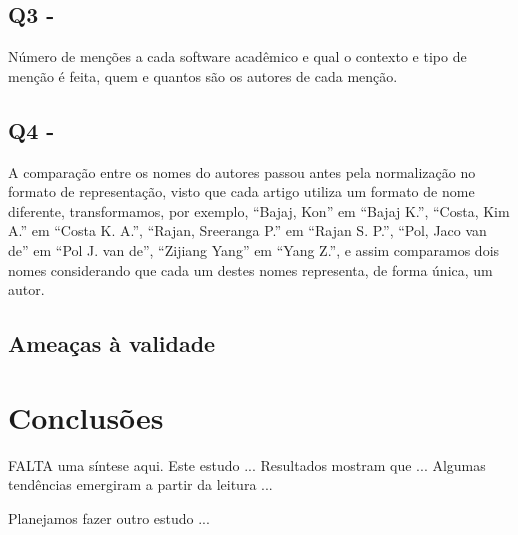 \subsection{Q3 - \EstudoDoisQuestaoTres}

Número de menções a cada software acadêmico e qual o contexto e tipo de menção
é feita, quem e quantos são os autores de cada menção.

\subsection{Q4 - \EstudoDoisQuestaoQuatro}

A comparação entre os nomes do autores passou antes pela normalização
no formato de representação, visto que cada artigo utiliza um formato
de nome diferente, transformamos, por exemplo, ``Bajaj, Kon'' em ``Bajaj K.'',
``Costa, Kim A.'' em ``Costa K. A.'', ``Rajan, Sreeranga P.'' em ``Rajan S. P.'',
``Pol, Jaco van de'' em ``Pol J. van de'', ``Zijiang Yang'' em ``Yang Z.'',
e assim comparamos dois nomes considerando que cada um destes nomes representa,
de forma única, um autor.

\subsection{Ameaças à validade}

\section{Conclusões}

FALTA uma síntese aqui. 
Este estudo ...
Resultados mostram que ...
Algumas tendências emergiram a partir da leitura ...

Planejamos fazer outro estudo ... 


